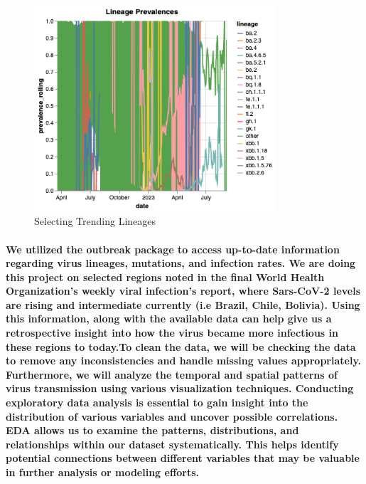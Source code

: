 \documentclass{article}
\begin{document}
\paragraph{\textbf{}}
\begin{figure}[h]
    \centering
    \includegraphics[width=0.8\textwidth]{lineage_viz.png} 
    \caption{Selecting Trending Lineages}
    \label{fig:my_label_2}
\end{figure}
\paragraph{\textbf{}}
\paragraph{We utilized the outbreak package to access up-to-date information regarding virus lineages, mutations, and infection rates. We are doing this project on selected regions noted in the final World Health Organization's weekly viral infection's report, where Sars-CoV-2 levels are rising and intermediate currently (i.e Brazil, Chile, Bolivia). Using this information, along with the available data can help give us a retrospective insight into how the virus became more infectious in these regions to today.To clean the data, we will be checking the data to remove any inconsistencies and handle missing values appropriately. Furthermore, we will analyze the temporal and spatial patterns of virus transmission using various visualization techniques. Conducting exploratory data analysis is essential to gain insight into the distribution of various variables and uncover possible correlations. EDA allows us to examine the patterns, distributions, and relationships within our dataset systematically. This helps identify potential connections between different variables that may be valuable in further analysis or modeling efforts.}
\end{document}
